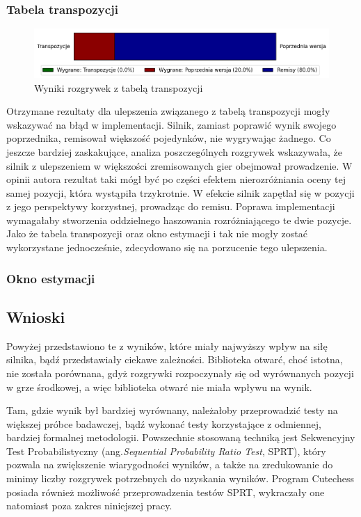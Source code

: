 \subsubsection{Tabela transpozycji}
\begin{figure}[ht]
    \centering
    \includegraphics[width=1\linewidth]{rozdzialy/rozdzial03/1_porownanie-wersji-silnika/rysunki/wyniki-transpozycje}
    \caption{Wyniki rozgrywek z tabelą transpozycji}
    \label{fig:wyniki-transpozycje}
\end{figure}
Otrzymane rezultaty dla ulepszenia związanego z tabelą transpozycji mogły wskazywać na błąd w implementacji.
Silnik, zamiast poprawić wynik swojego poprzednika, remisował większość pojedynków, nie wygrywając żadnego.
Co jeszcze bardziej zaskakujące, analiza poszczególnych rozgrywek wskazywała, że silnik z ulepszeniem w większości zremisowanych gier obejmował prowadzenie.
W opinii autora rezultat taki mógł być po części efektem nierozróżniania oceny tej samej pozycji, która wystąpiła trzykrotnie.
W efekcie silnik zapętlał się w pozycji z jego perspektywy korzystnej, prowadząc do remisu.
Poprawa implementacji wymagałaby stworzenia oddzielnego haszowania rozróżniającego te dwie pozycje.
Jako że tabela transpozycji oraz okno estymacji i tak nie mogły zostać wykorzystane jednocześnie, zdecydowano się na porzucenie tego ulepszenia.

\subsubsection{Okno estymacji}



\subsection{Wnioski}

Powyżej przedstawiono te z wyników, które miały najwyższy wpływ na siłę silnika, bądź przedstawiały ciekawe zależności.
Biblioteka otwarć, choć istotna, nie została porównana, gdyż rozgrywki rozpoczynały się od wyrównanych pozycji w grze środkowej, a więc biblioteka otwarć nie miała wpływu na wynik.

Tam, gdzie wynik był bardziej wyrównany, należałoby przeprowadzić testy na większej próbce badawczej, bądź wykonać testy korzystające z odmiennej, bardziej formalnej metodologii.
Powszechnie stosowaną techniką jest Sekwencyjny Test Probabilistyczny (ang.\~\emph{Sequential Probability Ratio Test}, SPRT), który pozwala na zwiększenie wiarygodności wyników, a także na zredukowanie do minimy liczby rozgrywek potrzebnych do uzyskania wyników. \cite{SPRT}
Program Cutechess posiada również możliwość przeprowadzenia testów SPRT, wykraczały one natomiast poza zakres niniejszej pracy.


